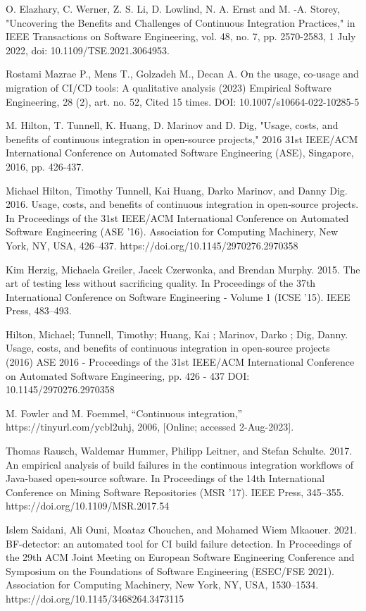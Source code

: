 \begin{thebibliography}{8}
O. Elazhary, C. Werner, Z. S. Li, D. Lowlind, N. A. Ernst and M. -A. Storey, "Uncovering the
Benefits and Challenges of Continuous Integration Practices," in IEEE Transactions on Software
Engineering, vol. 48, no. 7, pp. 2570-2583, 1 July 2022, doi: 10.1109/TSE.2021.3064953.

Rostami Mazrae P., Mens T., Golzadeh M., Decan A. On the usage, co-usage and migration of CI/CD
tools: A qualitative analysis (2023) Empirical Software Engineering, 28 (2), art. no. 52, Cited
15 times. DOI: 10.1007/s10664-022-10285-5

M. Hilton, T. Tunnell, K. Huang, D. Marinov and D. Dig, "Usage, costs, and benefits of continuous
integration in open-source projects," 2016 31st IEEE/ACM International Conference on Automated
Software Engineering (ASE), Singapore, 2016, pp. 426-437.

Michael Hilton, Timothy Tunnell, Kai Huang, Darko Marinov, and Danny Dig. 2016. Usage, costs, and
benefits of continuous integration in open-source projects. In Proceedings of the 31st IEEE/ACM
International Conference on Automated Software Engineering (ASE '16). Association for Computing
Machinery, New York, NY, USA, 426–437. https://doi.org/10.1145/2970276.2970358

Kim Herzig, Michaela Greiler, Jacek Czerwonka, and Brendan Murphy. 2015. The art of testing less
without sacrificing quality. In Proceedings of the 37th International Conference on Software
Engineering - Volume 1 (ICSE '15). IEEE Press, 483–493.

Hilton, Michael; Tunnell, Timothy; Huang, Kai ; Marinov, Darko ; Dig, Danny. Usage, costs, and
benefits of continuous integration in open-source projects (2016) ASE 2016 - Proceedings of the
31st IEEE/ACM International Conference on Automated Software Engineering, pp. 426 - 437
DOI: 10.1145/2970276.2970358

M. Fowler and M. Foemmel, “Continuous integration,” https://tinyurl.com/ycbl2uhj, 2006, 
[Online; accessed 2-Aug-2023].

Thomas Rausch, Waldemar Hummer, Philipp Leitner, and Stefan Schulte. 2017. An empirical analysis
of build failures in the continuous integration workflows of Java-based open-source software. In
Proceedings of the 14th International Conference on Mining Software Repositories (MSR '17). IEEE
Press, 345–355. https://doi.org/10.1109/MSR.2017.54

Islem Saidani, Ali Ouni, Moataz Chouchen, and Mohamed Wiem Mkaouer. 2021. BF-detector: an
automated tool for CI build failure detection. In Proceedings of the 29th ACM Joint Meeting on
European Software Engineering Conference and Symposium on the Foundations of Software Engineering
(ESEC/FSE 2021). Association for Computing Machinery, New York, NY, USA, 1530–1534.
https://doi.org/10.1145/3468264.3473115


\end{thebibliography}
